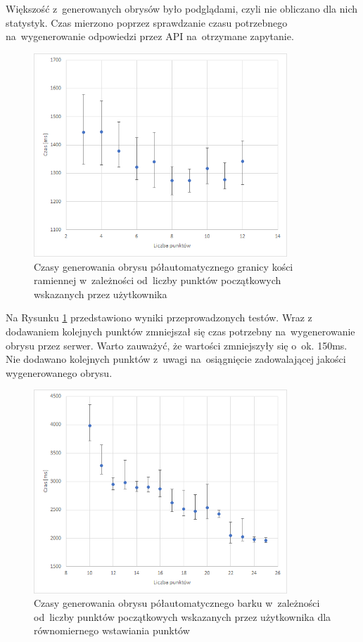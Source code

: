 \documentclass[a4paper,11pt,twoside,openright]{report}
\theoremstyle{definition}
\begin{document}
Większość z~generowanych obrysów było podglądami, czyli nie obliczano dla nich
statystyk. Czas mierzono poprzez sprawdzanie czasu potrzebnego na~wygenerowanie
odpowiedzi przez API na~otrzymane zapytanie.

\begin{figure}[h!]
	\center
	\includegraphics[width=0.85\textwidth]{152}
	\caption{Czasy generowania obrysu półautomatycznego granicy kości ramiennej
	 w~zależności od~liczby punktów
	początkowych wskazanych przez użytkownika}
    	\label{fig:testy_1}
\end{figure}

Na Rysunku \ref{fig:testy_1} przedstawiono wyniki przeprowadzonych testów. Wraz
z dodawaniem kolejnych punktów zmniejszał się czas potrzebny na~wygenerowanie
obrysu przez serwer. Warto zauważyć, że wartości zmniejszyły się o~ok. 150ms.
Nie dodawano kolejnych punktów z~uwagi na~osiągnięcie zadowalającej jakości
wygenerowanego obrysu.

\begin{figure}[h!]
	\center
	\includegraphics[width=0.85\textwidth]{151}
	\caption{Czasy generowania obrysu półautomatycznego barku w~zależności od~liczby punktów
	początkowych wskazanych przez użytkownika dla równomiernego wstawiania punktów}
    	\label{fig:testy_2}
\end{figure}
\end{document}

